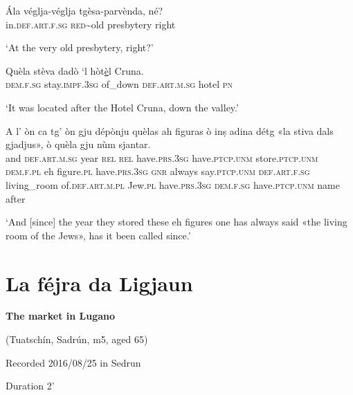 \begin{linenumbers}
\gll  Ála véglja-véglja tgèsa-parvènda, né?  \\
 in.\textsc{def.art.f.sg} \textsc{red}\textasciitilde{old} presbytery right\\
\end{linenumbers}
\medskip
\glt `At the very old presbytery, right?'
\medskip

\begin{linenumbers}
\gll  Quèla stèva dadò `l hòt\underline{è}l Cruna.  \\
 \textsc{dem.f.sg} stay.\textsc{impf.3sg} of\_down \textsc{def.art.m.sg} hotel \textsc{pn}\\
\end{linenumbers} 
\glt `It was located after the Hotel Cruna, down the valley.'
\medskip

\begin{linenumbers}
\gll A l’ òn ca tg’ òn gju dépònju quèlas ah figuras ò inṣ adina détg «la stiva dals gjadjus», ò quèla gju nùm sjantar.   \\
and \textsc{def.art.m.sg} year \textsc{rel} \textsc{rel} have.\textsc{prs.3sg} have.\textsc{ptcp.unm} store.\textsc{ptcp.unm} \textsc{dem.f.pl} eh figure.\textsc{pl} have.\textsc{prs.3sg} \textsc{gnr} always say.\textsc{ptcp.unm} \textsc{def.art.f.sg} living\_room of.\textsc{def.art.m.pl} Jew.\textsc{pl} have.\textsc{prs.3sg} \textsc{dem.f.sg} have.\textsc{ptcp.unm} name after\\
\end{linenumbers}
\medskip
\glt `And [since] the year they stored these eh figures one has always said «the living room of the Jews», has it been called since.'
\medskip

\section{La féjra da Ligjaun} 

\noindent
\textbf{The market in Lugano}

\noindent
(Tuatschín, Sadrún, m5, aged 65)

\noindent
Recorded 2016/08/25 in Sedrun

\noindent
Duration 2'

\bigskip


